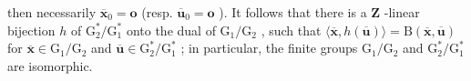 then necessarily \(\overline{\mathbf{x}}_0 = \mathbf{o}\) (resp. \(\overline{\mathbf{u}}_0 = \mathbf{o}\) ). It follows that there is a \(\mathbf{Z}\) -linear bijection \(h\) of \(\mathrm{G}_2^* / \mathrm{G}_1^*\) onto the dual of \(\mathrm{G}_1 / \mathrm{G}_2\) , such that \(\langle \overline{\mathbf{x}}, h(\overline{\mathbf{u}}) \rangle = \mathrm{B}(\overline{\mathbf{x}}, \overline{\mathbf{u}})\) for \(\overline{\mathbf{x}} \in \mathrm{G}_1 / \mathrm{G}_2\) and \(\overline{\mathbf{u}} \in \mathrm{G}_2^* / \mathrm{G}_1^*\) ; in particular, the finite groups \(\mathrm{G}_1 / \mathrm{G}_2\) and \(\mathrm{G}_2^* / \mathrm{G}_1^*\) are isomorphic.

